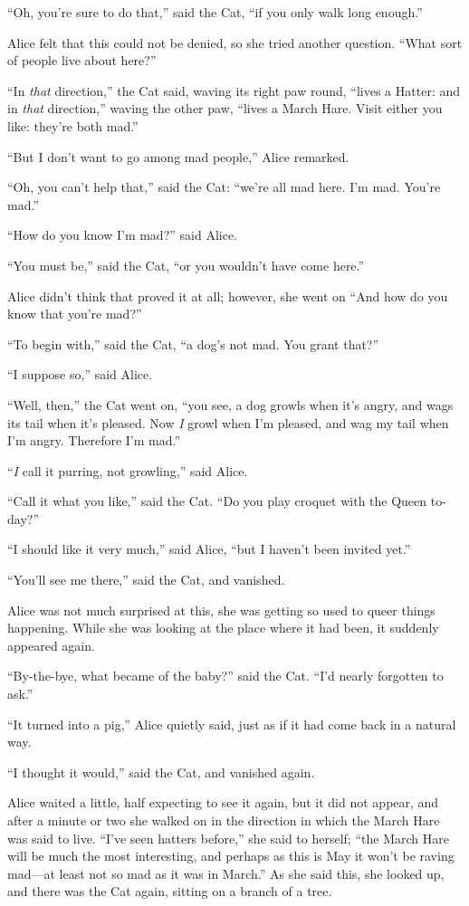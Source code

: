 \documentclass[11pt,openany,oneside]{book}
\begin{document}
“Oh, you’re sure to do that,” said the Cat, “if you only walk long enough.” 

Alice felt that this could not be denied, so she tried another question. “What sort of people live about here?” 

“In {\em that\/} direction,” the Cat said, waving its right paw round, “lives a Hatter: and in {\em that\/} direction,” waving the other paw, “lives a March Hare. Visit either you like: they’re both mad.” 

“But I don’t want to go among mad people,” Alice remarked. 

“Oh, you can’t help that,” said the Cat: “we’re all mad here. I’m mad. You’re mad.” 

“How do you know I’m mad?” said Alice. 

“You must be,” said the Cat, “or you wouldn’t have come here.” 

Alice didn’t think that proved it at all; however, she went on “And how do you know that you’re mad?” 

“To begin with,” said the Cat, “a dog’s not mad. You grant that?” 

“I suppose so,” said Alice. 

“Well, then,” the Cat went on, “you see, a dog growls when it’s angry, and wags its tail when it’s pleased. Now {\em I\/} growl when I’m pleased, and wag my tail when I’m angry. Therefore I’m mad.” 

“{\em I\/} call it purring, not growling,” said Alice. 

“Call it what you like,” said the Cat. “Do you play croquet with the Queen to-day?” 

“I should like it very much,” said Alice, “but I haven’t been invited yet.” 

“You’ll see me there,” said the Cat, and vanished. 

Alice was not much surprised at this, she was getting so used to queer things happening. While she was looking at the place where it had been, it suddenly appeared again. 

“By-the-bye, what became of the baby?” said the Cat. “I’d nearly forgotten to ask.” 

“It turned into a pig,” Alice quietly said, just as if it had come back in a natural way. 

“I thought it would,” said the Cat, and vanished again. 

Alice waited a little, half expecting to see it again, but it did not appear, and after a minute or two she walked on in the direction in which the March Hare was said to live. “I’ve seen hatters before,” she said to herself; “the March Hare will be much the most interesting, and perhaps as this is May it won’t be raving mad—at least not so mad as it was in March.” As she said this, she looked up, and there was the Cat again, sitting on a branch of a tree. 
\end{document}

